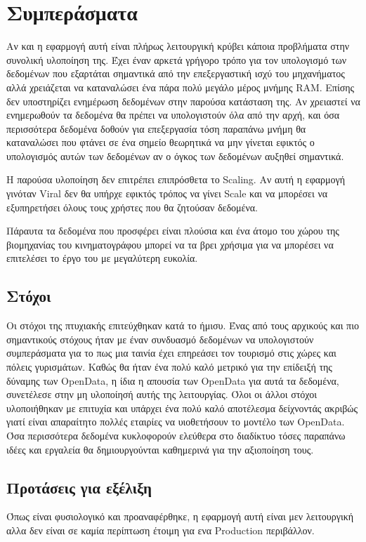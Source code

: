 \chapter{Συμπεράσματα}
Αν και η εφαρμογή αυτή είναι πλήρως λειτουργική κρύβει κάποια προβλήματα στην συνολική υλοποίηση της. Έχει έναν αρκετά γρήγορο τρόπο για τον υπολογισμό των δεδομένων που εξαρτάται σημαντικά από την επεξεργαστική ισχύ του μηχανήματος αλλά χρειάζεται να καταναλώσει ένα πάρα πολύ μεγάλο μέρος μνήμης RAM. Επίσης δεν υποστηρίζει ενημέρωση δεδομένων στην παρούσα κατάσταση της. Αν χρειαστεί να ενημερωθούν τα δεδομένα θα πρέπει να υπολογιστούν όλα από την αρχή, και όσα περισσότερα δεδομένα δοθούν για επεξεργασία τόση παραπάνω μνήμη θα καταναλώσει που φτάνει σε ένα σημείο θεωρητικά να μην γίνεται εφικτός ο υπολογισμός αυτών των δεδομένων αν ο όγκος των δεδομένων αυξηθεί σημαντικά.

Η παρούσα υλοποίηση δεν επιτρέπει επιπρόσθετα το Scaling. Αν αυτή η εφαρμογή γινόταν Viral δεν θα υπήρχε εφικτός τρόπος να γίνει Scale και να μπορέσει να εξυπηρετήσει όλους τους χρήστες που θα ζητούσαν δεδομένα.

Πάραυτα τα δεδομένα που προσφέρει είναι πλούσια και ένα άτομο του χώρου της βιομηχανίας του κινηματογράφου μπορεί να τα βρει χρήσιμα για να μπορέσει να επιτελέσει το έργο του με μεγαλύτερη ευκολία.

\section{Στόχοι}
Οι στόχοι της πτυχιακής επιτεύχθηκαν κατά το ήμισυ. Ένας από τους αρχικούς και πιο σημαντικούς στόχους ήταν με έναν συνδυασμό δεδομένων να υπολογιστούν συμπεράσματα για το πως μια ταινία έχει επηρεάσει τον τουρισμό στις χώρες και πόλεις γυρισμάτων. Καθώς θα ήταν ένα πολύ καλό μετρικό για την επίδειξή της δύναμης των OpenData, η ίδια η απουσία των OpenData για αυτά τα δεδομένα, συνετέλεσε στην μη υλοποίησή αυτής της λειτουργίας. Όλοι οι άλλοι στόχοι υλοποιήθηκαν με επιτυχία και υπάρχει ένα πολύ καλό αποτέλεσμα δείχνοντάς ακριβώς γιατί είναι απαραίτητο πολλές εταιρίες να υιοθετήσουν το μοντέλο των OpenData. Όσα περισσότερα δεδομένα κυκλοφορούν ελεύθερα στο διαδίκτυο τόσες παραπάνω ιδέες και εργαλεία θα δημιουργούνται καθημερινά για την αξιοποίηση τους.

\section{Προτάσεις για εξέλιξη}
Όπως είναι φυσιολογικό και προαναφέρθηκε, η εφαρμογή αυτή είναι μεν λειτουργική αλλα δεν είναι σε καμία περίπτωση έτοιμη για ενα Production περιβάλλον. 

